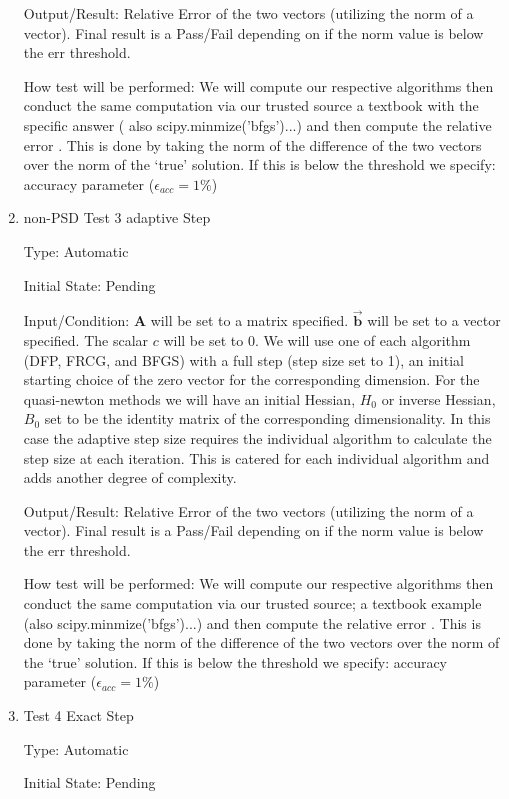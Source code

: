 \documentclass[12pt, titlepage]{article}
\begin{document}
\begin{enumerate}
Output/Result: Relative Error of the two vectors (utilizing the norm of a vector). Final result is a Pass/Fail depending on if the norm value is below the err threshold.
					
How test will be performed: We will compute our respective algorithms then conduct the same 
computation via our trusted source a textbook with the specific answer ( also scipy.minmize('bfgs')...) and then compute the relative 
error \citep{Boyd2006}. This is done by taking the norm of the difference of the two vectors over the norm of
the `true' solution. If this is below the threshold we specify: accuracy parameter ($\epsilon_{acc} = 1\%$) 

\item{non-PSD Test 3 adaptive Step}\

Type: Automatic
					
Initial State: Pending
					
Input/Condition: $\mathbf{A}$ will be set to a matrix specified.
$\mathbf{\vec{b}}$ will be set to a vector specified. The scalar $c$ will be set to 0. We will
use one of each algorithm (DFP, FRCG, and BFGS) with a full step (step size set to 1),
an initial starting choice of the zero vector for the corresponding dimension. For the 
quasi-newton methods we will have an initial Hessian, $H_{0}$ or inverse Hessian, $B_{0}$ set to be the identity 
matrix of the corresponding dimensionality. In this case the adaptive step size requires 
the individual algorithm to calculate the step size at each iteration. This is catered for 
each individual algorithm and adds another degree of complexity.
					
Output/Result: Relative Error of the two vectors (utilizing the norm of a vector). Final result is a Pass/Fail depending on if the norm value is below the err threshold.
					
How test will be performed: We will compute our respective algorithms then conduct the same 
computation via our trusted source; a textbook example (also scipy.minmize('bfgs')...) and then compute the relative 
error \citep{Boyd2006}. This is done by taking the norm of the difference of the two vectors over the norm of
the `true' solution. If this is below the threshold we specify: accuracy parameter ($\epsilon_{acc} = 1\%$) 

\item{Test 4 Exact Step}\

Type: Automatic
					
Initial State: Pending
					

\end{enumerate}
\end{document}
